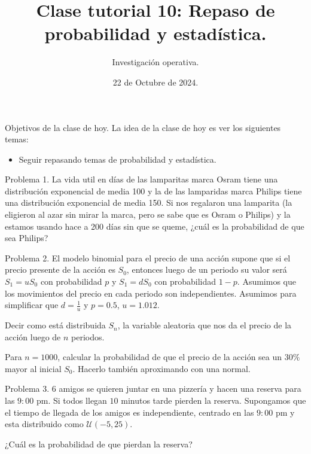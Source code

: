 \documentclass{beamer}
\title[]{Clase tutorial 10: Repaso de probabilidad y estadística.}
\date{22 de Octubre de 2024.}
\author[]{ Investigación operativa.}
\institute{Universidad de San Andrés}
\begin{document}
\maketitle

\begin{frame}{Objetivos de la clase de hoy.}
  La idea de la clase de hoy es ver los siguientes temas:
  \begin{itemize}
    \item Seguir repasando temas de probabilidad y estadística.
  \end{itemize}
\end{frame}

\begin{frame}[fragile]{Problema 1.}
  La vida util en días de las lamparitas marca Osram tiene una distribución exponencial de media 100 y la de las lamparidas marca Philips tiene una distribución exponencial de media 150. 
  Si nos regalaron una lamparita (la eligieron al azar sin mirar la marca, pero se sabe que es Osram o Philips) y la estamos usando hace a 200 días sin que se queme, ¿cuál es la probabilidad de que sea Philips?
\end{frame}


\begin{frame}[fragile]{Problema 2.}
  El modelo binomial para el precio de una acción supone que si el precio presente de la acción es $S_0$, entonces luego de un periodo su valor será $S_1 = uS_0$ con probabilidad $p$ y $S_1 = dS_0$ con probabilidad $1 - p$.
Asumimos que los movimientos del precio en cada periodo son independientes. Asumimos para simplificar que $d = \frac{1}{u}$ y $p = 0.5$, $u = 1.012$.

Decir como está distribuida $S_n$, la variable aleatoria que nos da el precio de la acción luego de $n$ periodos.

Para $n = 1000$, calcular la probabilidad de que el precio de la acción sea un $30\%$ mayor al inicial $S_0$. 
Hacerlo también aproximando con una normal.
\end{frame}

\begin{frame}[fragile]{Problema 3.}
  $6$ amigos se quieren juntar en una pizzería y hacen una reserva para las $9:00 \text{ pm}$. Si todos llegan $10$ minutos tarde pierden la reserva. Supongamos que el tiempo de llegada de los amigos es independiente, centrado en las $9:00 \text{ pm}$ y esta distribuido como $\mathcal{U}(-5,25)$. 
  
  ¿Cuál es la probabilidad de que pierdan la reserva?


\end{frame}
\end{document}
